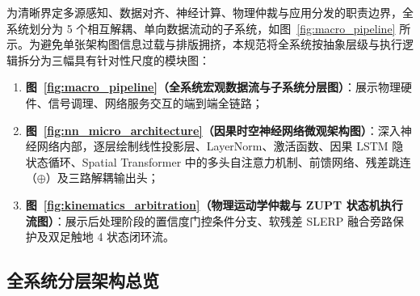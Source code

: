 \documentclass[UTF8,11pt,a4paper]{ctexart}
\begin{document}
为清晰界定多源感知、数据对齐、神经计算、物理仲裁与应用分发的职责边界，全系统划分为 5 个相互解耦、单向数据流动的子系统，如图~\ref{fig:macro_pipeline} 所示。为避免单张架构图信息过载与排版拥挤，本规范将全系统按抽象层级与执行逻辑拆分为三幅具有针对性尺度的模块图：
\begin{enumerate}
    \item \textbf{图~\ref{fig:macro_pipeline}（全系统宏观数据流与子系统分层图）}：展示物理硬件、信号调理、网络服务交互的端到端全链路；
    \item \textbf{图~\ref{fig:nn_micro_architecture}（因果时空神经网络微观架构图）}：深入神经网络内部，逐层绘制线性投影层、LayerNorm、激活函数、因果 LSTM 隐状态循环、Spatial Transformer 中的多头自注意力机制、前馈网络、残差跳连（$\oplus$）及三路解耦输出头；
    \item \textbf{图~\ref{fig:kinematics_arbitration}（物理运动学仲裁与 ZUPT 状态机执行流图）}：展示后处理阶段的置信度门控条件分支、软残差 SLERP 融合旁路保护及双足触地 4 状态闭环流。
\end{enumerate}

\subsection{全系统分层架构总览}
\end{document}
